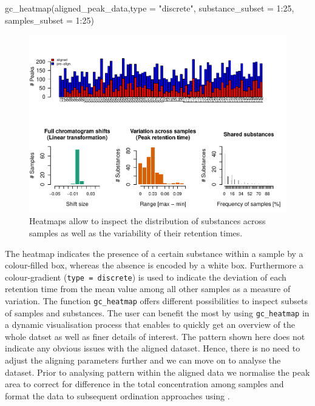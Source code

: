 \begin{Schunk}
\begin{Sinput}
gc_heatmap(aligned_peak_data,type = "discrete",
           substance_subset = 1:25, samples_subset = 1:25)
\end{Sinput}
\begin{figure}

{\centering \includegraphics{ottensmann-stoffel-hoffman_files/figure-latex/unnamed-chunk-7-1} 

}

\caption[Heatmaps allow to inspect the distribution of substances across samples as well as the variability of their retention times]{Heatmaps allow to inspect the distribution of substances across samples as well as the variability of their retention times.}\label{fig:unnamed-chunk-7}
\end{figure}
\end{Schunk}

The heatmap indicates the presence of a certain substance within a
sample by a colour-filled box, whereas the absence is encoded by a white
box. Furthermore a colour-gradient
(\texttt{type\ =\ \textquotesingle{}discrete\textquotesingle{}}) is used
to indicate the deviation of each retention time from the mean value
among all other samples as a measure of variation. The function
\texttt{gc\_heatmap} offers different possibilities to inspect subsets
of samples and substances. The user can benefit the most by using
\texttt{gc\_heatmap} in a dynamic visualisation process that enables to
quickly get an overview of the whole datset as well as finer details of
interest. The pattern shown here does not indicate any obvious issues
with the aligned dataset. Hence, there is no need to adjust the aligning
parameters further and we can move on to analyse the dataset. Prior to
analysing pattern within the aligned data we normalise the peak area to
correct for difference in the total concentration among samples and
format the data to subsequent ordination approaches using .

